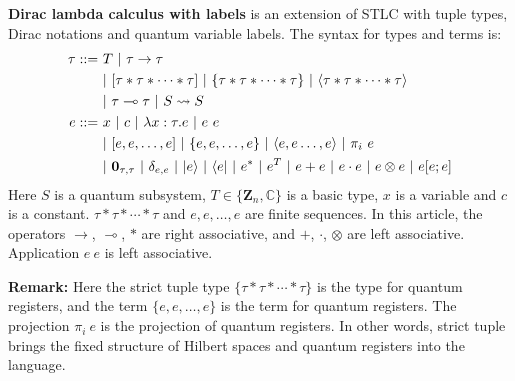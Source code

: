 \begin{definition}
  \textbf{Dirac lambda calculus with labels} is an extension of STLC with tuple types, Dirac notations and quantum variable labels. The syntax for types and terms is:
  \begin{align*}
    \tau ::=&\ T\ |\ \tau \to \tau\\
      &\ |\ [ \tau *\tau*\cdots * \tau ]\ |\ \{ \tau * \tau * \cdots * \tau \}\ |\ \< \tau * \tau * \cdots * \tau \> \\
      &\ |\ \tau \multimap \tau\ |\ S \rightsquigarrow S\\
    e ::=&\ x\ |\ c\ |\ \lambda x : \tau. e\ |\ e\ e\\
      &\ |\ [e, e, \dots, e]\ |\ \{ e, e, \dots, e \}\ |\ \<e, e \dots, e \>\ |\ \pi_i\ e \\
      &\ |\ \mathbf{0}_{\tau, \tau}\ |\ \delta_{e, e}\ |\ \ket{e}\ |\ \bra{e}\ |\ e^*\ |\ e^T\ |\ e + e\ |\ e \cdot e\ |\ e \otimes e\ |\ e[e; e] 
  \end{align*}
  Here $S$ is a quantum subsystem, $T \in \{\mathbf{Z}_n, \mathbb{C}\}$ is a basic type, $x$ is a variable and $c$ is a constant. $\tau *\tau*\cdots * \tau$ and $e, e, \dots, e$ are finite sequences.
  In this article, the operators $\to$, $\multimap$, $*$ are right associative, and $+$, $\cdot$, $\otimes$ are left associative. Application $e\ e$ is left associative.
\end{definition}

\textbf{Remark:} Here the strict tuple type $\{ \tau * \tau * \cdots * \tau \}$ is the type for quantum registers, and the term $\{ e, e, \dots, e \}$ is the term for quantum registers. The projection $\pi_i\ e$ is the projection of quantum registers.
In other words, strict tuple brings the fixed structure of Hilbert spaces and quantum registers into the language.


